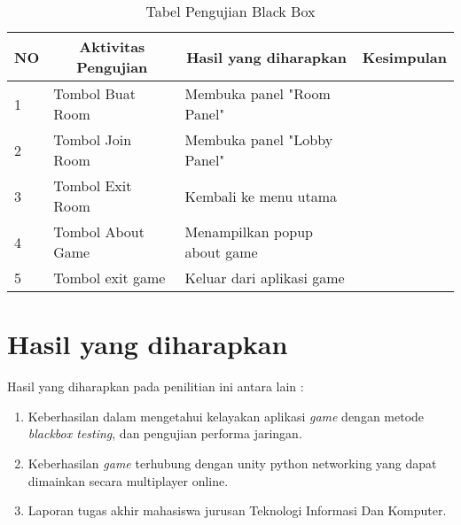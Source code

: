     \begin{table}[h]
    \centering
    \caption{Tabel Pengujian Black Box}
    \label{lab:tabel-pengujian}
    \begin{tabular}{|l|l|l|l|}
    \hline
    \multicolumn{1}{|c|}{NO} & \multicolumn{1}{c|}{Aktivitas Pengujian} & \multicolumn{1}{c|}{Hasil yang diharapkan} & \multicolumn{1}{c|}{Kesimpulan} \\ \hline
    1                        & Tombol Buat Room                         & Membuka panel "Room Panel"                 &                                 \\ \hline
    2                        & Tombol Join Room                         & Membuka panel "Lobby Panel"                &                                 \\ \hline
    3                        & Tombol Exit Room                         & Kembali ke menu utama                      &                                 \\ \hline
    4                        & Tombol About Game                        & Menampilkan popup about game               &                                 \\ \hline
    5                        & Tombol exit game                         & Keluar dari aplikasi game                  &                                 \\ \hline
    \end{tabular}
    \end{table}
\newpage        
\section{Hasil yang diharapkan}
Hasil yang diharapkan pada penilitian ini antara lain :
\begin{enumerate}
    \item Keberhasilan dalam mengetahui kelayakan aplikasi \textit{game} dengan metode \textit{blackbox testing}, dan pengujian performa jaringan.
    \item Keberhasilan \textit{game} terhubung dengan unity python networking yang dapat dimainkan secara multiplayer online.
    \item Laporan tugas akhir mahasiswa jurusan Teknologi Informasi Dan Komputer.
\end{enumerate}